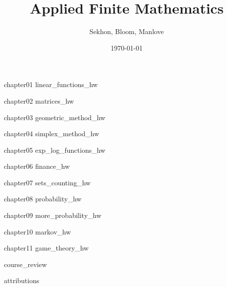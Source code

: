\documentclass[12pt]{book}
\begin{document}

\frontmatter
\title{Applied Finite Mathematics}
\author{Sekhon, Bloom, Manlove}
\date{\today}
\maketitle
\tableofcontents


\mainmatter
{chapter01}
{linear_functions_hw}

{chapter02}
{matrices_hw}

{chapter03}
{geometric_method_hw}

{chapter04}
{simplex_method_hw}

{chapter05}
{exp_log_functions_hw}

{chapter06}
{finance_hw}

{chapter07}
{sets_counting_hw}

{chapter08}
{probability_hw}

{chapter09}
{more_probability_hw}

{chapter10}
{markov_hw}

{chapter11}
{game_theory_hw}

{course_review}


\backmatter

{attributions}
\end{document}
